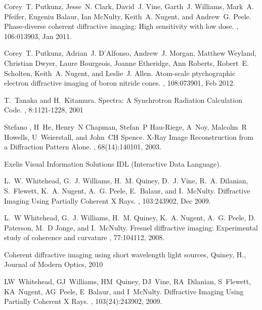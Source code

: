 \documentclass[]{nadia}
\begin{document}
\begin{thebibliography}{50}
Corey~T. Putkunz, Jesse~N. Clark, David~J. Vine, Garth~J. Williams, Mark~A.
  Pfeifer, Eugeniu Balaur, Ian McNulty, Keith~A. Nugent, and Andrew~G. Peele.
\newblock Phase-diverse coherent diffractive imaging: High sensitivity with low
  dose.
, 106:013903, Jan 2011.

Corey~T. Putkunz, Adrian~J. D'Alfonso, Andrew~J. Morgan, Matthew Weyland,
  Christian Dwyer, Laure Bourgeois, Joanne Etheridge, Ann Roberts, Robert~E.
  Scholten, Keith~A. Nugent, and Leslie~J. Allen.
\newblock Atom-scale ptychographic electron diffractive imaging of boron
  nitride cones.
, 108:073901, Feb 2012.

T.~Tanaka and H.~Kitamura.
\newblock Spectra: A Synchrotron Radiation Calculation Code.
, 8:1121-1228, 2001


Stefano , H~He, Henry~N Chapman, Stefan~P Hau-Riege, A~Noy, Malcolm~R
  Howells, U~Weierstall, and John~CH Spence.
\newblock X-Ray Image Reconstruction from a Diffraction Pattern Alone.
, 68(14):140101, 2003.

Exelis Visual Information Solutions
\newblock IDL (Interactive Data Language).

L.~W. Whitehead, G.~J. Williams, H.~M. Quiney, D.~J. Vine, R.~A. Dilanian,
  S.~Flewett, K.~A. Nugent, A.~G. Peele, E.~Balaur, and I.~McNulty.
\newblock Diffractive Imaging Using Partially Coherent X Rays.
, 103:243902, Dec 2009.

L.~W Whitehead, G.~J. Williams, H.~M. Quiney, K.~A. Nugent, A.~G. Peele, D. Paterson, M.~D Jonge,  and I.~McNulty.
\newblock Fresnel diffractive imaging: Experimental study of coherence and curvature
, 77:104112, 2008.



 Coherent diffractive imaging using short wavelength light sources, Quiney, H., Journal of Modern Optics, 2010

LW~Whitehead, GJ~Williams, HM~Quiney, DJ~Vine, RA~Dilanian, S~Flewett,
  KA~Nugent, AG~Peele, E~Balaur, and I~McNulty.
\newblock Diffractive Imaging Using Partially Coherent X Rays.
, 103(24):243902, 2009.

\end{thebibliography}
\end{document}
